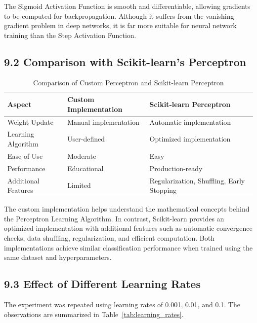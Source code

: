 \documentclass[11pt]{article}
\begin{document}
The Sigmoid Activation Function is smooth and differentiable, allowing gradients to be computed for backpropagation. Although it suffers from the vanishing gradient problem in deep networks, it is far more suitable for neural network training than the Step Activation Function.

\subsection*{9.2 Comparison with Scikit-learn's Perceptron}


\begin{table}[H]
\centering
\caption{Comparison of Custom Perceptron and Scikit-learn Perceptron}
\label{tab:sklearn_comparison}
\begin{tabular}{|p{4cm}|p{4.5cm}|p{4.5cm}|}
\hline
\textbf{Aspect} & \textbf{Custom Implementation} & \textbf{Scikit-learn Perceptron} \\
\hline
Weight Update & Manual implementation & Automatic implementation \\
\hline
Learning Algorithm & User-defined & Optimized implementation \\
\hline
Ease of Use & Moderate & Easy \\
\hline
Performance & Educational & Production-ready \\
\hline
Additional Features & Limited & Regularization, Shuffling, Early Stopping \\
\hline
\end{tabular}
\end{table}

The custom implementation helps understand the mathematical concepts behind the Perceptron Learning Algorithm. In contrast, Scikit-learn provides an optimized implementation with additional features such as automatic convergence checks, data shuffling, regularization, and efficient computation. Both implementations achieve similar classification performance when trained using the same dataset and hyperparameters.

\subsection*{9.3 Effect of Different Learning Rates}

The experiment was repeated using learning rates of 0.001, 0.01, and 0.1. The observations are summarized in Table~\ref{tab:learning_rates}.
\end{document}
